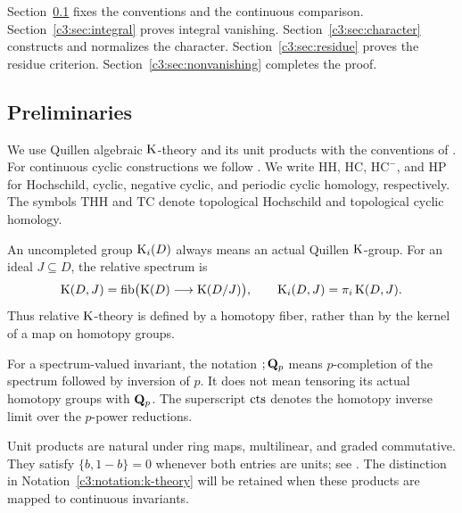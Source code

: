 Section~\ref{c3:sec:preliminaries} fixes the conventions and the continuous
comparison. Section~\ref{c3:sec:integral} proves integral vanishing.
Section~\ref{c3:sec:character} constructs and normalizes the character.
Section~\ref{c3:sec:residue} proves the residue criterion.
Section~\ref{c3:sec:nonvanishing} completes the proof.







\subsection{Preliminaries}\label{c3:sec:preliminaries}

We use Quillen algebraic $\operatorname{K}$-theory and its unit products with the
conventions of \cite{Quillen,Weibel}.
For continuous cyclic constructions we follow
\cite[Definition~4.1 and Proposition~4.2]{AMMN}.
We write $\mathrm{HH}$, $\mathrm{HC}$, $\mathrm{HC}^{-}$, and $\mathrm{HP}$ for Hochschild, cyclic, negative cyclic, and periodic cyclic homology, respectively. The symbols $\mathrm{THH}$ and $\mathrm{TC}$ denote topological Hochschild and topological cyclic homology.

\begin{notation}\label{c3:notation:k-theory}
An uncompleted group $\operatorname{K}_i(D)$ always means an actual Quillen
$\operatorname{K}$-group.
For an ideal $J\subseteq D$, the relative spectrum is
\[
 \operatorname{K}(D,J)=\operatorname{fib}\bigl(\operatorname{K}(D)\longrightarrow\operatorname{K}(D/J)\bigr),
 \qquad
 \operatorname{K}_i(D,J)=\pi_i\operatorname{K}(D,J).
\]
Thus relative $\operatorname{K}$-theory is defined by a homotopy fiber, rather than
by the kernel of a map on homotopy groups.

For a spectrum-valued invariant, the notation $;\mathbf{Q}_p$ means
$p$-completion of the spectrum followed by inversion of $p$.
It does not mean tensoring its actual homotopy groups with $\mathbf{Q}_p$.
The superscript $\mathrm{cts}$ denotes the homotopy inverse limit over
the $p$-power reductions.
\end{notation}

Unit products are natural under ring maps, multilinear, and graded
commutative. They satisfy $\{b,1-b\}=0$ whenever both entries are units;
see \cite[III, Lemma~5.10.2, Definition~5.11, and the unit-product
discussion following Theorem~5.11.1]{Weibel}.
The distinction in Notation~\ref{c3:notation:k-theory} will be retained
when these products are mapped to continuous invariants.

